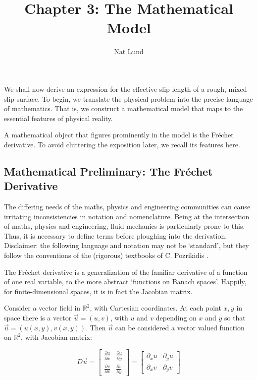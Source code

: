 \documentclass[a4paper]{report}
\title{Chapter 3: The Mathematical Model}
\author{Nat Lund}
\begin{document}
\maketitle

We shall now derive an expression for the effective slip length of a rough, mixed-slip surface.  To begin, we translate the physical problem into the precise language of mathematics.  That is, we construct a mathematical model that maps to the essential features of physical reality.

A mathematical object that figures prominently in the model is the Fr\'{e}chet derivative.  To avoid cluttering the exposition later, we recall its features here.


\subsection*{Mathematical Preliminary: The Fr\'{e}chet Derivative}


The differing needs of the maths, physics and engineering communities can cause irritating inconsistencies in notation and nomenclature.  Being at the intersection of maths, physics and engineering, fluid mechanics is particularly prone to this.  Thus, it is necessary to define terms before ploughing into the derivation.  Disclaimer: the following language and notation may not be `standard', but they follow the conventions of the (rigorous) textbooks of C. Pozrikidis \cite{Pozrikidis1997, Pozrikidis2001}.


The Fr\'{e}chet derivative is a generalization of the familiar derivative of a function of one real variable, to the more abstract `functions on Banach spaces'.  Happily, for finite-dimensional spaces, it is in fact the Jacobian matrix.

Consider a vector field in $\mathbb{R}^2$, with Cartesian coordinates.  At each point $x,y$ in space there is a vector $\vec{u} = (u,v)$, with $u$ and $v$ depending on $x$ and $y$ so that $\vec{u} = (u(x,y),v(x,y))$.  Then $\vec{u}$ can be considered a vector valued function on $\mathbb{R}^2$, with Jacobian matrix:

\begin{equation}
D \vec{u} = 
\begin{bmatrix}
\frac{\partial u}{\partial x} & \frac{\partial u}{\partial y} \\
\frac{\partial v}{\partial x} & \frac{\partial v}{\partial y}
\end{bmatrix}
=
\begin{bmatrix}
\partial_x u & \partial_y u \\
\partial_x v & \partial_y v
\end{bmatrix}
\end{equation}
\end{document}
